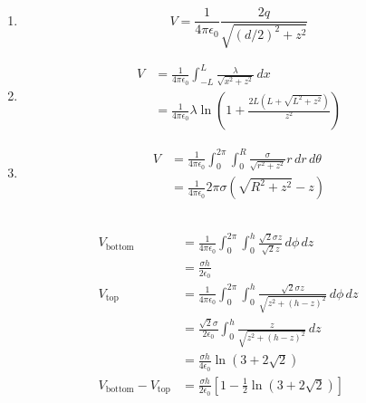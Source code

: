 \documentclass{article}
\newcommand{\ke}{\frac{1}{4 \pi \epsilon_0}}
\begin{document}
\subsection{}

\begin{enumerate}
  \item \[V = \ke \frac{2 q}{\sqrt{(d / 2)^2 + z^2}}\]

  \item

        \begin{align*}
          V & = \ke \int_{-L}^L \frac{\lambda}{\sqrt{x^2 + z^2}} \,d x                    \\
            & = \ke \lambda \ln \left( 1 + \frac{2 L (L + \sqrt{L^2 + z^2})}{z^2} \right)
        \end{align*}

  \item

        \begin{align*}
          V & = \ke \int_0^{2 \pi} \int_0^R \frac{\sigma}{\sqrt{r^2 + z^2}} r \,d r \,d \theta \\
            & = \ke 2 \pi \sigma (\sqrt{R^2 + z^2} - z)
        \end{align*}
\end{enumerate}

\subsection{}

\begin{align*}
  V_\text{bottom}                & = \ke \int_0^{2 \pi} \int_0^h \frac{\sqrt{2} \sigma z}{\sqrt{2} z} \,d \phi \,d z             \\
                                 & = \frac{\sigma h}{2 \epsilon_0}                                                               \\
  V_\text{top}                   & = \ke \int_0^{2 \pi} \int_0^h \frac{\sqrt{2} \sigma z}{\sqrt{z^2 + (h - z)^2}} \,d \phi \,d z \\
                                 & = \frac{\sqrt{2} \sigma}{2 \epsilon_0} \int_0^h \frac{z}{\sqrt{z^2 + (h - z)^2}} \,d z        \\
                                 & = \frac{\sigma h}{4 \epsilon_0} \ln (3 + 2 \sqrt{2})                                          \\
  V_\text{bottom} - V_\text{top} & = \frac{\sigma h}{2 \epsilon_0} \left[ 1 - \frac{1}{2} \ln (3 + 2 \sqrt{2}) \right]           \\
\end{align*}
\end{document}
